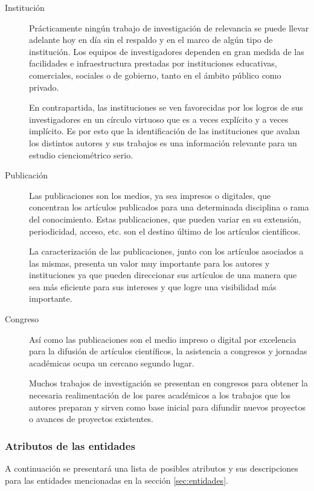 \begin{description}
	\item[Institución] Prácticamente ningún trabajo de investigación de relevancia se puede llevar adelante hoy en día sin el respaldo y en el marco de algún tipo de institución. Los equipos de investigadores dependen en gran medida de las facilidades e infraestructura prestadas por instituciones educativas, comerciales, sociales o de gobierno, tanto en el ámbito público como privado.
	
	En contrapartida, las instituciones se ven favorecidas por los logros de sus investigadores en un círculo virtuoso que es a veces explícito y a veces implícito. Es por esto que la identificación de las instituciones que avalan los distintos autores y sus trabajos es una información relevante para un estudio cienciométrico serio.
	
	\item[Publicación] Las publicaciones son los medios, ya sea impresos o digitales, que concentran los artículos publicados para una determinada disciplina o rama del conocimiento. Estas publicaciones, que pueden variar en su extensión, periodicidad, acceso, etc. son el destino último de los artículos científicos.
	
	La caracterización de las publicaciones, junto con los artículos asociados a las mismas, presenta un valor muy importante para los autores y instituciones ya que pueden direccionar sus artículos de una manera que sea más eficiente para sus intereses y que logre una visibilidad más importante.
	
	\item[Congreso] Así como las publicaciones son el medio impreso o digital por excelencia para la difusión de artículos científicos, la asistencia a congresos y jornadas académicas ocupa un cercano segundo lugar.
	
	Muchos trabajos de investigación se presentan en congresos para obtener la necesaria realimentación de los pares académicos a los trabajos que los autores preparan y sirven como base inicial para difundir nuevos proyectos o avances de proyectos existentes.
\end{description}

\subsubsection{Atributos de las entidades}\label{sec:atributos}

A continuación se presentará una lista de posibles atributos y sus descripciones para las entidades mencionadas en la sección \ref{sec:entidades}.

